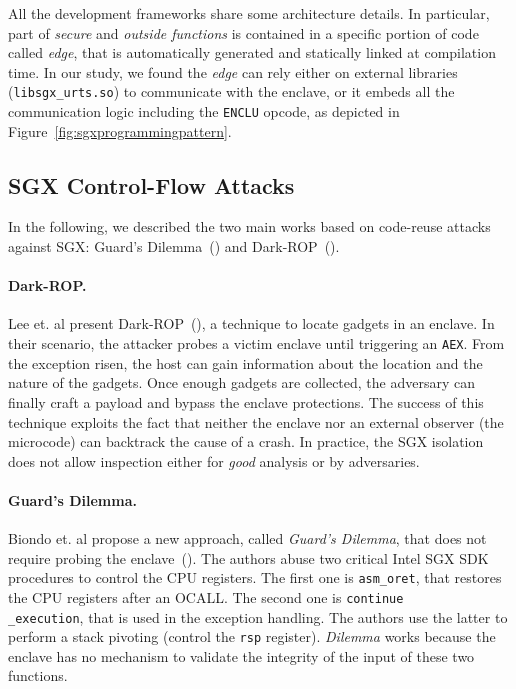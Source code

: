 All the development frameworks share some architecture details.
In particular, part of \emph{secure} and \emph{outside functions} is contained 
in a specific portion of code called \emph{edge}, that is automatically 
generated and statically linked at compilation time.
In our study, we found the \emph{edge} can rely either on external libraries 
(\eg \texttt{libsgx\_urts.so}) to communicate with the enclave, or it embeds
all the communication logic including the \texttt{ENCLU} opcode, as depicted in 
Figure~\ref{fig:sgxprogrammingpattern}.

\subsection{SGX Control-Flow Attacks}
\label{ssec:sgx-control-flow-attacks}

In the following, we described the two main works based on code-reuse 
attacks against SGX: Guard's Dilemma~(\cite{biondo2018guard}) and 
Dark-ROP~(\cite{lee2017hacking}).

\paragraph{Dark-ROP.}
Lee et. al present Dark-ROP~(\cite{lee2017hacking}), a technique to locate 
gadgets in an enclave.
In their scenario, the attacker probes
a victim enclave until triggering an \texttt{AEX}.
From the exception risen, the host can gain information about the location and 
the nature of the gadgets.
Once enough gadgets are collected, the adversary can finally craft a payload 
and bypass the enclave protections.
The success of this technique exploits the fact that neither the enclave 
nor an external observer (\eg the microcode) can backtrack the cause of a 
crash.
In practice, the SGX isolation does not allow inspection either for 
\emph{good} analysis or by adversaries.

\paragraph{Guard's Dilemma.}
Biondo et. al propose a new approach, called \emph{Guard's Dilemma}, that does 
not require probing the enclave~(\cite{biondo2018guard}).
The authors abuse two critical Intel SGX SDK procedures to control the CPU 
registers.
The first one is \texttt{asm\_oret}, that restores the CPU registers after an  
OCALL.
The second one is \texttt{continue\\\_execution}, that is used in the exception
handling.
The authors use the latter to perform a stack pivoting (\ie control the 
\texttt{rsp} register).
\emph{Dilemma} works because the enclave has no mechanism to validate
the integrity of the input of these two functions.